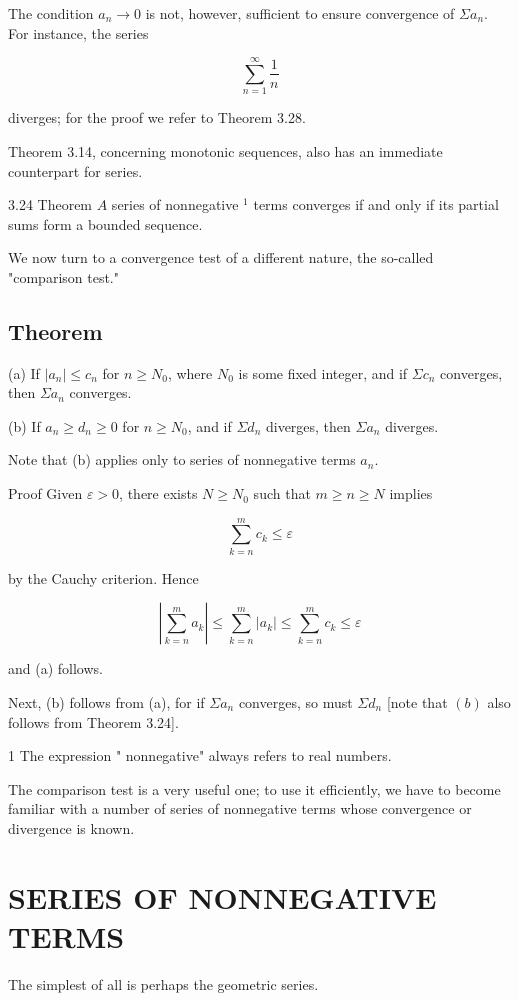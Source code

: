 \documentclass[10pt]{article}
\begin{document}
The condition $a_{n} \rightarrow 0$ is not, however, sufficient to ensure convergence of $\Sigma a_{n}$. For instance, the series

$$
\sum_{n=1}^{\infty} \frac{1}{n}
$$

diverges; for the proof we refer to Theorem 3.28.

Theorem 3.14, concerning monotonic sequences, also has an immediate counterpart for series.

3.24 Theorem $A$ series of nonnegative ${ }^{1}$ terms converges if and only if its partial sums form a bounded sequence.

We now turn to a convergence test of a different nature, the so-called "comparison test."

\subsection{Theorem}
(a) If $\left|a_{n}\right| \leq c_{n}$ for $n \geq N_{0}$, where $N_{0}$ is some fixed integer, and if $\Sigma c_{n}$ converges, then $\Sigma a_{n}$ converges.

(b) If $a_{n} \geq d_{n} \geq 0$ for $n \geq N_{0}$, and if $\Sigma d_{n}$ diverges, then $\Sigma a_{n}$ diverges.

Note that (b) applies only to series of nonnegative terms $a_{n}$.

Proof Given $\varepsilon>0$, there exists $N \geq N_{0}$ such that $m \geq n \geq N$ implies

$$
\sum_{k=n}^{m} c_{k} \leq \varepsilon
$$

by the Cauchy criterion. Hence

$$
\left|\sum_{k=n}^{m} a_{k}\right| \leq \sum_{k=n}^{m}\left|a_{k}\right| \leq \sum_{k=n}^{m} c_{k} \leq \varepsilon
$$

and (a) follows.

Next, (b) follows from (a), for if $\Sigma a_{n}$ converges, so must $\Sigma d_{n}$ [note that $(b)$ also follows from Theorem 3.24].

1 The expression " nonnegative" always refers to real numbers.

The comparison test is a very useful one; to use it efficiently, we have to become familiar with a number of series of nonnegative terms whose convergence or divergence is known.

\section{SERIES OF NONNEGATIVE TERMS}
The simplest of all is perhaps the geometric series.
\end{document}
